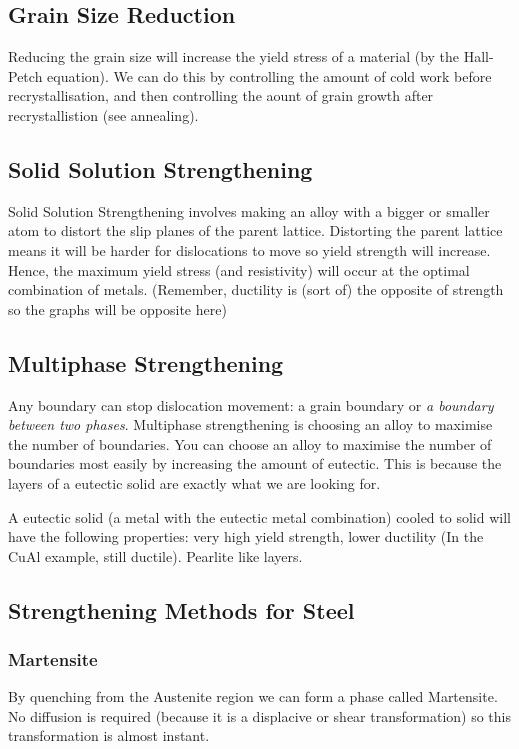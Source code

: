 \documentclass[12pt]{article}
\begin{document}
\subsection{Grain Size Reduction}
Reducing the grain size will increase the yield stress of a material (by the Hall-Petch equation).
We can do this by controlling the amount of cold work before recrystallisation, and then controlling the aount of grain growth after recrystallistion (see annealing).

\subsection{Solid Solution Strengthening}
Solid Solution Strengthening involves making an alloy with a bigger or smaller atom to distort the slip planes of the parent lattice.
Distorting the parent lattice means it will be harder for dislocations to move so yield strength will increase.
Hence, the maximum yield stress (and resistivity) will occur at the optimal combination of metals.
(Remember, ductility is (sort of) the opposite of strength so the graphs will be opposite here)

\subsection{Multiphase Strengthening}
Any boundary can stop dislocation movement: a grain boundary or \textit{a boundary between two phases}. 
Multiphase strengthening is choosing an alloy to maximise the number of boundaries.
You can choose an alloy to maximise the number of boundaries most easily by increasing the amount of eutectic. 
This is because the layers of a eutectic solid are exactly what we are looking for.

A eutectic solid (a metal with the eutectic metal combination) cooled to solid will have the following properties:
very high yield strength, lower ductility (In the CuAl example, still ductile). Pearlite like layers.

\subsection{Strengthening Methods for Steel}
\subsubsection{Martensite}
By quenching from the Austenite region we can form a phase called Martensite.
No diffusion is required (because it is a displacive or shear transformation) so this transformation is almost instant.
\end{document}
